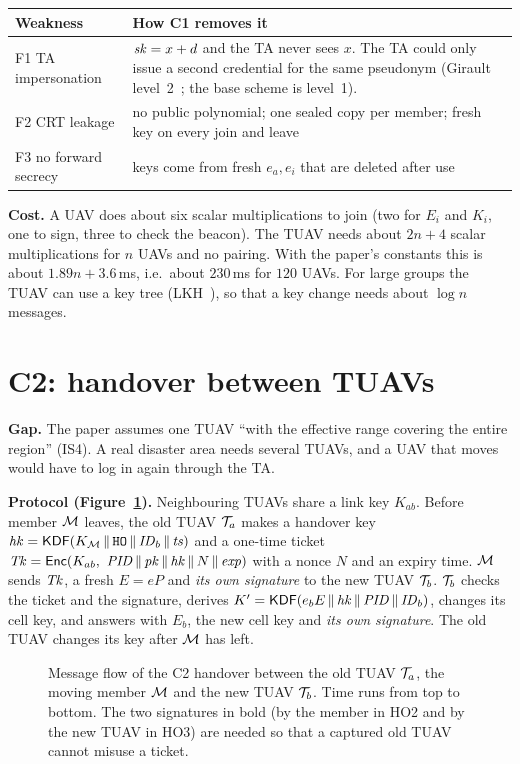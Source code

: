 \documentclass[11pt,openany]{report}
\begin{document}
\begin{center}
\small
\begin{tabularx}{\linewidth}{@{}l X@{}}
\toprule
\textbf{Weakness} & \textbf{How C1 removes it}\\
\midrule
F1 TA impersonation & $\mathit{sk}=x+d$ and the TA never sees $x$. The TA could only issue a second credential for the same pseudonym (Girault level~2~\cite{girault}; the base scheme is level~1).\\
F2 CRT leakage & no public polynomial; one sealed copy per member; fresh key on every join and leave\\
F3 no forward secrecy & keys come from fresh $e_a,e_i$ that are deleted after use\\
\bottomrule
\end{tabularx}
\end{center}

\textbf{Cost.} A UAV does about six scalar multiplications to join (two for $E_i$ and $K_i$, one to sign, three to check the beacon). The TUAV needs
about $2n+4$ scalar multiplications for $n$ UAVs and no pairing. With the paper's constants this is about $1.89n+3.6$\,ms, i.e.\ about $230$\,ms for
$120$ UAVs. For large groups the TUAV can use a key tree (LKH~\cite{wgl98}), so that a key change needs about $\log n$ messages.

\section{C2: handover between TUAVs}\label{sec:c2}
\textbf{Gap.} The paper assumes one TUAV ``with the effective range covering the entire region'' (IS4). A real disaster area needs several TUAVs, and a
UAV that moves would have to log in again through the TA.

\textbf{Protocol (Figure~\ref{fig:c2flow}).} Neighbouring TUAVs share a link key $K_{ab}$. Before member $\mathcal{M}$ leaves, the old TUAV $\mathcal{T}_a$ makes a handover
key $\mathit{hk}=\mathsf{KDF}(K_{\mathcal{M}}\,\|\,\texttt{HO}\,\|\,\mathit{ID}_b\,\|\,\mathit{ts})$ and a one-time ticket
$\Tk=\Enc(K_{ab},\ \PID\cat\pk\cat\hk\cat N\cat\mathit{exp})$ with a nonce $N$ and an expiry time. $\mathcal{M}$ sends $\mathit{Tk}$, a fresh $E=eP$ and \emph{its own
signature} to the new TUAV $\mathcal{T}_b$. $\mathcal{T}_b$ checks the ticket and the signature, derives $K'=\mathsf{KDF}(e_bE\,\|\,\mathit{hk}\,\|\,\mathit{PID}\,\|\,\mathit{ID}_b)$, changes its cell key, and
answers with $E_b$, the new cell key and \emph{its own signature}. The old TUAV changes its key after $\mathcal{M}$ has left.

\begin{figure}[H]
\centering

\caption{Message flow of the C2 handover between the old TUAV $\mathcal{T}_a$, the moving member $\mathcal{M}$ and the new TUAV $\mathcal{T}_b$. Time runs from top to bottom. The
two signatures in bold (by the member in HO2 and by the new TUAV in HO3) are needed so that a captured old TUAV cannot misuse a ticket.}
\label{fig:c2flow}
\end{figure}
\end{document}
